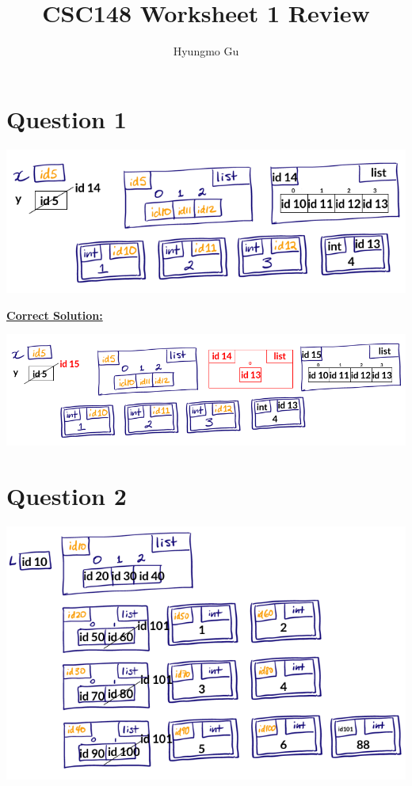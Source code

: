 \documentclass[12pt]{article}
\begin{document}
\title{CSC148 Worksheet 1 Review}
\author{Hyungmo Gu}
\maketitle

\section*{Question 1}
\begin{center}
\includegraphics[width=0.8\linewidth]{images/worksheet_1_review_q1_solution.png}
\end{center}

\bigskip

\begin{mdframed}
    \underline{\textbf{Correct Solution:}}

    \bigskip

    \begin{center}
    \includegraphics[width=0.8 \linewidth]{images/worksheet_1_review_q1_correction.png}
    \end{center}

\end{mdframed}

\section*{Question 2}
\begin{center}
\includegraphics[width=0.8\linewidth]{images/worksheet_1_review_q2_solution.png}
\end{center}
\end{document}
